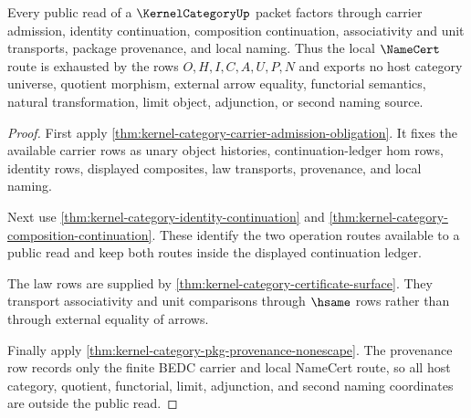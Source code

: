 \begin{theorem}
\label{thm:kernel-category-namecert-route-exhaustion}
Every public read of a $\KernelCategoryUp$ packet factors through carrier
admission, identity continuation, composition continuation, associativity and
unit transports, package provenance, and local naming. Thus the local
$\NameCert$ route is exhausted by the rows $O,H,I,C,A,U,P,N$ and exports no
host category universe, quotient morphism, external arrow equality, functorial
semantics, natural transformation, limit object, adjunction, or second naming
source.
\end{theorem}
\begin{proof}
First apply
\autoref{thm:kernel-category-carrier-admission-obligation}. It fixes the
available carrier rows as unary object histories, continuation-ledger hom
rows, identity rows, displayed composites, law transports, provenance, and
local naming.

Next use \autoref{thm:kernel-category-identity-continuation} and
\autoref{thm:kernel-category-composition-continuation}. These identify the two
operation routes available to a public read and keep both routes inside the
displayed continuation ledger.

The law rows are supplied by \autoref{thm:kernel-category-certificate-surface}.
They transport associativity and unit comparisons through $\hsame$ rows rather
than through external equality of arrows.

Finally apply \autoref{thm:kernel-category-pkg-provenance-nonescape}. The
provenance row records only the finite BEDC carrier and local NameCert route,
so all host category, quotient, functorial, limit, adjunction, and second
naming coordinates are outside the public read.
\end{proof}
